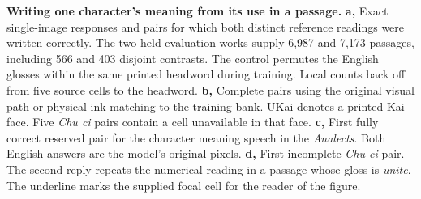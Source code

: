 \textbf{Writing one character's meaning from its use in a passage.}
\textbf{a,} Exact single-image responses and pairs for which both distinct reference readings were written correctly. The two held evaluation works supply 6,987 and 7,173 passages, including 566 and 403 disjoint contrasts. The control permutes the English glosses within the same printed headword during training. Local counts back off from five source cells to the headword. \textbf{b,} Complete pairs using the original visual path or physical ink matching to the training bank. UKai denotes a printed Kai face. Five \textit{Chu ci} pairs contain a cell unavailable in that face. \textbf{c,} First fully correct reserved pair for the character meaning speech in the \textit{Analects}. Both English answers are the model's original pixels. \textbf{d,} First incomplete \textit{Chu ci} pair. The second reply repeats the numerical reading in a passage whose gloss is \textit{unite}. The underline marks the supplied focal cell for the reader of the figure.
